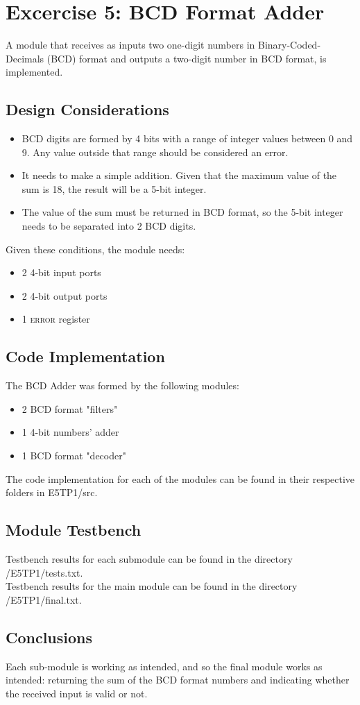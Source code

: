 \section {\color{olive}Excercise 5: BCD Format Adder}
A module that receives as inputs two one-digit numbers in Binary-Coded-Decimals (BCD) format and outputs a two-digit number in BCD format, is implemented.

\subsection{\color{purple}Design Considerations}
\begin{itemize}
\item BCD digits are formed by 4 bits with a range of integer values between 0 and 9. Any value outside that range should be considered an error.
\item It needs to make a simple addition. Given that the maximum value of the sum is 18, the result will be a 5-bit integer.
\item The value of the sum must be returned in BCD format, so the 5-bit integer needs to be separated into 2 BCD digits.
\end{itemize}

Given these conditions, the module needs:
\begin{itemize}
\item 2 4-bit input ports
\item 2 4-bit output ports
\item 1 \textsc{error} register
\end{itemize}

\subsection{\color{purple}Code Implementation}
The BCD Adder was formed by the following modules:
\begin{itemize}
\item 2 BCD format "filters"
\item 1 4-bit numbers' adder
\item 1 BCD format "decoder"
\end{itemize}

The code implementation for each of the modules can be found in their respective folders in E5TP1/src.

\subsection{\color{purple}Module Testbench}
Testbench results for each submodule can be found in the directory /E5TP1/tests.txt.\\
Testbench results for the main module can be found in the directory /E5TP1/final.txt.

\subsection{\color{purple}Conclusions}
Each sub-module is working as intended, and so the final module works as intended: returning the sum of
the BCD format numbers and indicating whether the received input is valid or not.
